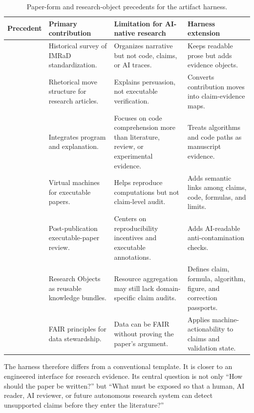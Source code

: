 \documentclass{article}
\begin{document}
\begin{table}[t]
\caption{Paper-form and research-object precedents for the artifact harness.}
\centering
\small
\begin{tabular}{p{2.7cm}p{3.4cm}p{3.7cm}p{3.6cm}}
\toprule
\textbf{Precedent} & \textbf{Primary contribution} & \textbf{Limitation for AI-native research} & \textbf{Harness extension} \\
\midrule
\citet{sollaci2004imrad} & Historical survey of IMRaD standardization. & Organizes narrative but not code, claims, or AI traces. & Keeps readable prose but adds evidence objects. \\
\citet{swales1990genre} & Rhetorical move structure for research articles. & Explains persuasion, not executable verification. & Converts contribution moves into claim-evidence maps. \\
\citet{knuth1984literate} & Integrates program and explanation. & Focuses on code comprehension more than literature, review, or experimental evidence. & Treats algorithms and code paths as manuscript evidence. \\
\citet{vanGorp2011share} & Virtual machines for executable papers. & Helps reproduce computations but not claim-level audit. & Adds semantic links among claims, code, formulas, and limits. \\
\citet{leBorgne2011openreview} & Post-publication executable-paper review. & Centers on reproducibility incentives and executable annotations. & Adds AI-readable anti-contamination checks. \\
\citet{bechhofer2010researchobjects} & Research Objects as reusable knowledge bundles. & Resource aggregation may still lack domain-specific claim audits. & Defines claim, formula, algorithm, figure, and correction passports. \\
\citet{wilkinson2016fair} & FAIR principles for data stewardship. & Data can be FAIR without proving the paper's argument. & Applies machine-actionability to claims and validation state. \\
\bottomrule
\end{tabular}
\label{tab:paper_form_precedents}
\end{table}

The harness therefore differs from a conventional template. It is closer to an engineered interface for research evidence. Its central question is not only ``How should the paper be written?'' but ``What must be exposed so that a human, AI reader, AI reviewer, or future autonomous research system can detect unsupported claims before they enter the literature?''
\end{document}

